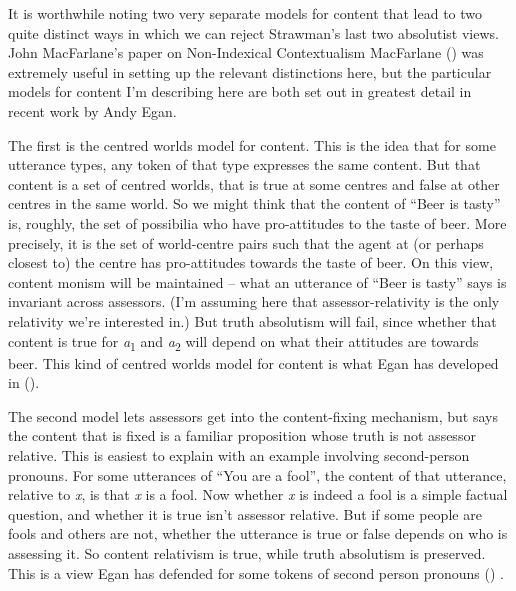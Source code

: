 \documentclass[
  11pt,
  letterpaper,
  DIV=11,
  numbers=noendperiod,
  twoside]{scrartcl}
\begin{document}
It is worthwhile noting two very separate models for content that lead
to two quite distinct ways in which we can reject Strawman's last two
absolutist views. John MacFarlane's paper on Non-Indexical Contextualism
MacFarlane () was extremely
useful in setting up the relevant distinctions here, but the particular
models for content I'm describing here are both set out in greatest
detail in recent work by Andy Egan.

The first is the centred worlds model for content. This is the idea that
for some utterance types, any token of that type expresses the same
content. But that content is a set of centred worlds, that is true at
some centres and false at other centres in the same world. So we might
think that the content of ``Beer is tasty'' is, roughly, the set of
possibilia who have pro-attitudes to the taste of beer. More precisely,
it is the set of world-centre pairs such that the agent at (or perhaps
closest to) the centre has pro-attitudes towards the taste of beer. On
this view, content monism will be maintained -- what an utterance of
``Beer is tasty'' says is invariant across assessors. (I'm assuming here
that assessor-relativity is the only relativity we're interested in.)
But truth absolutism will fail, since whether that content is true for
\emph{a}\textsubscript{1} and \emph{a}\textsubscript{2} will depend on
what their attitudes are towards beer. This kind of centred worlds model
for content is what Egan has developed in
().

The second model lets assessors get into the content-fixing mechanism,
but says the content that is fixed is a familiar proposition whose truth
is not assessor relative. This is easiest to explain with an example
involving second-person pronouns. For some utterances of ``You are a
fool'', the content of that utterance, relative to \emph{x}, is that
\emph{x} is a fool. Now whether \emph{x} is indeed a fool is a simple
factual question, and whether it is true isn't assessor relative. But if
some people are fools and others are not, whether the utterance is true
or false depends on who is assessing it. So content relativism is true,
while truth absolutism is preserved. This is a view Egan has defended
for some tokens of second person pronouns
() .
\end{document}
